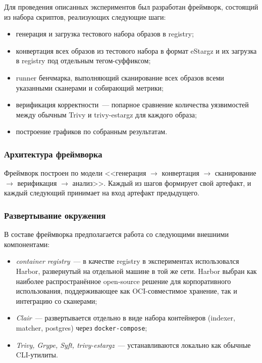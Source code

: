 Для проведения описанных экспериментов был разработан фреймворк, состоящий из набора скриптов, реализующих следующие шаги:

\begin{itemize}
\item генерация и загрузка тестового набора образов в registry;
\item конвертация всех образов из тестового набора в формат eStargz и их загрузка в registry под отдельным тегом-суффиксом;
\item runner бенчмарка, выполняющий сканирование всех образов всеми указанными сканерами и собирающий метрики;
\item верификация корректности~--- попарное сравнение количества уязвимостей между обычным Trivy и trivy-estargz для каждого образа;
\item построение графиков по собранным результатам.
\end{itemize}

\subsubsection{Архитектура фреймворка}

Фреймворк построен по модели <<генерация $\rightarrow$ конвертация $\rightarrow$ сканирование $\rightarrow$ верификация $\rightarrow$ анализ>>. Каждый из шагов формирует свой артефакт, и каждый следующий принимает на вход артефакт предыдущего.

\subsubsection{Развертывание окружения}

В составе фреймворка предполагается работа со следующими внешними компонентами:

\begin{itemize}
\item \textit{container registry}~--- в качестве registry в экспериментах использовался Harbor, развернутый на отдельной машине в той же сети. Harbor выбран как наиболее распространённое open-source решение для корпоративного использования, поддерживающее как OCI-совместимое хранение, так и интеграцию со сканерами;
\item \textit{Clair}~--- развертывается отдельно в виде набора контейнеров (indexer, matcher, postgres) через \texttt{docker-compose};
\item \textit{Trivy, Grype, Syft, trivy-estargz}~--- устанавливаются локально как обычные CLI-утилиты.
\end{itemize}

